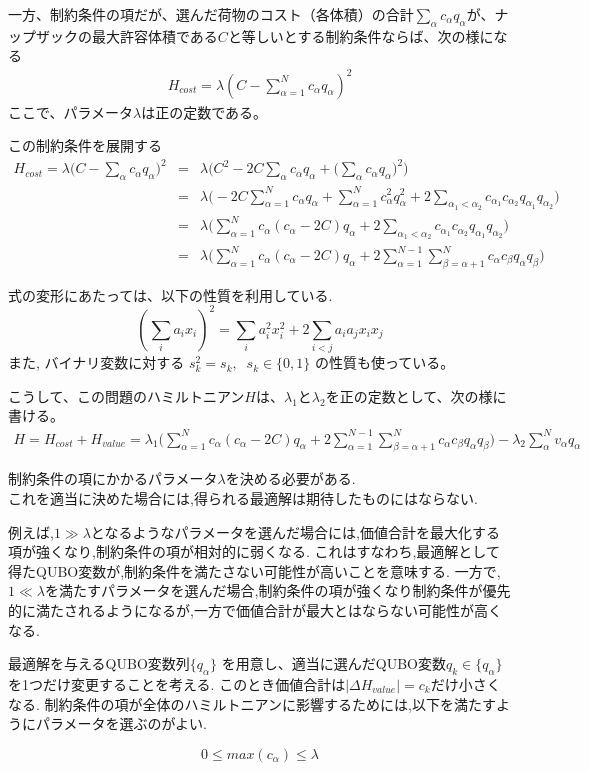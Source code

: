 \documentclass[uplatex,dvipdfmx,a4paper,11pt,oneside,openany]{jsbook}
\begin{document}
一方、制約条件の項だが、選んだ荷物のコスト（各体積）の合計$\sum_\alpha c_\alpha q_\alpha$が、ナップザックの最大許容体積である$C$と等しいとする制約条件ならば、次の様になる
\begin{eqnarray}
  H_{cost} = \lambda\left(C-\sum_{\alpha=1}^N c_\alpha q_\alpha\right)^2
\end{eqnarray}
ここで、パラメータ$\lambda$は正の定数である。

この制約条件を展開する
\begin{eqnarray*}
  H_{cost} = \lambda\bigg(C - \sum_\alpha c_\alpha q_\alpha\bigg)^2
  &=&\lambda\bigg(C^2 - 2C\sum_\alpha c_\alpha q_\alpha + \bigg(\sum_\alpha c_\alpha q_\alpha\bigg)^2\bigg)\\
  &=&\lambda\bigg(-2C\sum_{\alpha=1}^Nc_\alpha q_\alpha + \sum_{\alpha=1}^Nc_\alpha^2 q_\alpha^2 + 2\sum_{\alpha_1<\alpha_2}c_{\alpha_1}c_{\alpha_2}q_{\alpha_1}q_{\alpha_2}\bigg)\\
  &=&\lambda\bigg(\sum_{\alpha=1}^Nc_\alpha(c_\alpha-2C)q_\alpha + 2\sum_{\alpha_1<\alpha_2}c_{\alpha_1}c_{\alpha_2}q_{\alpha_1}q_{\alpha_2}\bigg)\\
&=&\lambda\bigg(\sum_{\alpha=1}^Nc_\alpha(c_\alpha-2C)q_\alpha+2\sum_{\alpha=1}^{N-1}\sum_{\beta=\alpha+1}^Nc_\alpha c_\beta q_\alpha q_\beta\bigg)
\end{eqnarray*}

\begin{screen}
式の変形にあたっては、以下の性質を利用している.
\[
\left(\sum_i a_i x_i\right)^2=\sum_i a_i^2 x_i^2 + 2\sum_{i<j}a_i a_j x_i x_j
\]
また, バイナリ変数に対する $s_k^2=s_k,\;\; s_k \in \{0, 1\}$ の性質も使っている。
\end{screen}

こうして、この問題のハミルトニアン$H$は、$\lambda_1$と$\lambda_2$を正の定数として、次の様に書ける。
\begin{eqnarray*}
  H = H_{cost} + H_{value} = \lambda_1\bigg(\sum_{\alpha=1}^Nc_\alpha(c_\alpha-2C)q_\alpha+2\sum_{\alpha=1}^{N-1}\sum_{\beta=\alpha+1}^Nc_\alpha c_\beta q_\alpha q_\beta\bigg) - \lambda_2\sum_\alpha^Nv_\alpha q_\alpha
\end{eqnarray*}


\begin{screen}
制約条件の項にかかるパラメータ$\lambda$を決める必要がある.\\
これを適当に決めた場合には,得られる最適解は期待したものにはならない.

例えば,$1\gg\lambda$となるようなパラメータを選んだ場合には,価値合計を最大化する項が強くなり,制約条件の項が相対的に弱くなる.
これはすなわち,最適解として得たQUBO変数が,制約条件を満たさない可能性が高いことを意味する.
一方で,$1\ll\lambda$を満たすパラメータを選んだ場合,制約条件の項が強くなり制約条件が優先的に満たされるようになるが,一方で価値合計が最大とはならない可能性が高くなる.

最適解を与えるQUBO変数列$\{q_\alpha\}$
を用意し、適当に選んだQUBO変数$q_k \in \{q_\alpha\}$を1つだけ変更することを考える.
このとき価値合計は$|\Delta H_{value}|=c_k$だけ小さくなる.
制約条件の項が全体のハミルトニアンに影響するためには,以下を満たすようにパラメータを選ぶのがよい.

\[
0 \le max(c_\alpha)\le\lambda
\]
\end{screen}
\end{document}
